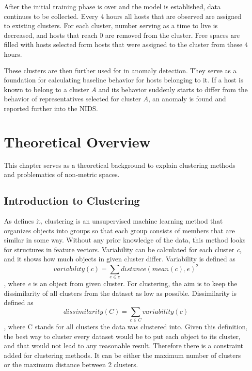 \documentclass[thesis=B,english]{FITthesis}[2012/10/20]
\begin{document}
After the initial training phase is over and the model is established, data continues to be collected.
Every 4 hours all hosts that are observed are assigned to existing clusters.
For each cluster, number serving as a time to live is decreased, and hosts that reach 0 are removed from the cluster.
Free spaces are filled with hosts selected form hosts that were assigned to the cluster from these 4 hours.

These clusters are then further used for in anomaly detection.
They serve as a foundation for calculating baseline behavior for hosts belonging to it.
If a host is known to belong to a cluster $A$ and its behavior suddenly starts to differ from the behavior of representatives selected for cluster $A$, an anomaly is found and reported further into the NIDS.


\chapter{Theoretical Overview}

This chapter serves as a theoretical background to explain clustering methods and problematics of non-metric spaces.

\section{Introduction to Clustering}
As \cite{guttag2016introduction} defines it, clustering is an unsupervised machine learning method that organizes objects into groups so that each group consists of members that are similar in some way.
Without any prior knowledge of the data, this method looks for structures in feature vectors.
Variability can be calculated for each cluster \textit{c}, and it shows how much objects in given cluster differ.
Variability is defined as $$ variability(c) = \sum_{e \in c} distance(mean(c), e)^2 $$, where \textit{e} is an object from given cluster.
For clustering, the aim is to keep the dissimilarity of all clusters from the dataset as low as possible.
Dissimilarity is defined as $$ dissimilarity(C) = \sum_{c \in C} variability(c) $$, where C stands for all clusters the data was clustered into.
Given this definition, the best way to cluster every dataset would be to put each object to its cluster, and that would not lead to any reasonable result.
Therefore there is a constraint added for clustering methods.
It can be either the maximum number of clusters or the maximum distance between 2 clusters. \\
\end{document}
